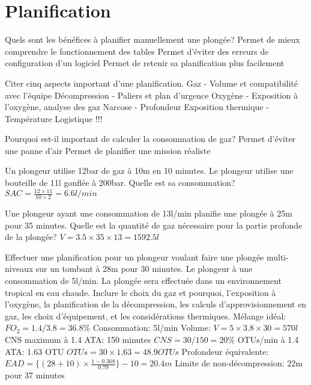 \documentclass[english,12pt,a4paper]{article}
\begin{document}
	\section{Planification}
	\begin{outline}
		\1 Quels sont les bénéfices à planifier manuellement une plongée?
			\2 Permet de mieux comprendre le fonctionnement des tables
			\2 Permet d'éviter des erreurs de configuration d'un logiciel
			\2 Permet de retenir sa planification plus facilement

		\1 Citer cinq aspects important d'une planification.
			\2 Gaz - Volume et compatibilité avec l'équipe
			\2 Décompression - Paliers et plan d'urgence
			\2 Oxygène - Exposition à l'oxygène, analyse des gaz
			\2 Narcose - Profondeur
			\2 Exposition thermique - Température
			\2 Logistique !!!

		\1 Pourquoi est-il important de calculer la consommation de gaz?
			\2 Permet d'éviter une panne d'air
			\2 Permet de planifier une mission réaliste

		\1 Un plongeur utilise 12bar de gaz à 10m en 10 minutes. Le plongeur utilise une bouteille de 11l gonflée à 200bar. Quelle est sa consommation?
			\2 $SAC=\frac{12 \times 11}{10 \times 2}=6.6l/min$

		\1 Une plongeur ayant une consommation de 13l/min planifie une plongée à 25m pour 35 minutes. Quelle est la quantité de gaz nécessaire pour la partie profonde de la plongée?
			\2 $V=3.5 \times 35 \times 13=1592.5l$

		\1 Effectuer une planification pour un plongeur voulant faire une plongée multi-niveaux sur un tombant à 28m pour 30 minutes. Le plongeur à une consommation de 5l/min. La plongée sera effectuée dans un environnement tropical en eau chaude. Inclure le choix du gaz et pourquoi, l'exposition à l'oxygène, la planification de la décompression, les calculs d'approvisionnement en gaz, les choix d'équipement, et les considérations thermiques.
			\2 Mélange idéal: $FO_2 = 1.4/3.8 = 36.8\%$
			\2 Consommation: 5l/min
			\2 Volume: $V=5 \times 3.8 \times 30 = 570l$
			\2 CNS maximum à 1.4 ATA: 150 minutes
			\2 $CNS=30/150=20\%$
			\2 OTUs/min à 1.4 ATA: 1.63 OTU
			\2 $OTUs=30 \times 1.63 = 48.9OTUs$
			\2 Profondeur équivalente:
			\2 $EAD= \{ (28+10)\times \frac{1-0.368}{0.79} \}-10 = 20.4m$
			\2 Limite de non-décompression: 22m pour 37 minutes
	\end{outline}
	\pagebreak

\end{document}
